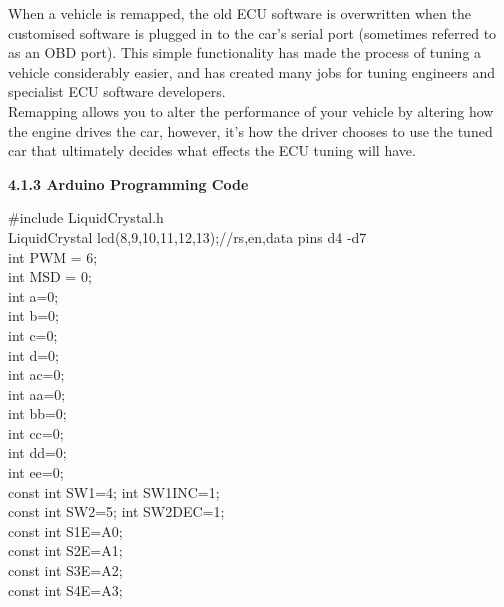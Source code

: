 \documentclass[a4paper,12pt, English]{article}
\begin{document}
\begin{normalsize}
When a vehicle is remapped, the old ECU software is overwritten when the customised software is plugged in to the car’s serial port (sometimes referred to as an OBD port). This simple functionality has made the process of tuning a vehicle considerably easier, and has created many jobs for tuning engineers and specialist ECU software developers.\\
Remapping allows you to alter the performance of your vehicle by altering how the engine drives the car, however, it’s how the driver chooses to use the tuned car that ultimately decides what effects the ECU tuning will have.\\
\newline
\begin{large}
\textbf{4.1.3 Arduino Programming Code}
\end{large}
\newline
\#include \<LiquidCrystal.h\>\\
LiquidCrystal lcd(8,9,10,11,12,13);//rs,en,data pins d4 -d7\\
int PWM = 6;\\
int MSD = 0;\\

int a=0;\\
int b=0;\\
int c=0;\\
int d=0;\\

int ac=0;\\
int aa=0;\\
int bb=0;\\
int cc=0;\\
int dd=0;\\
int ee=0;\\
const int SW1=4; int SW1INC=1;\\  
const int SW2=5; int SW2DEC=1;\\

const int S1E=A0;\\
const int S2E=A1;\\
const int S3E=A2;\\
const int S4E=A3;\\


\end{normalsize}
\end{document}
